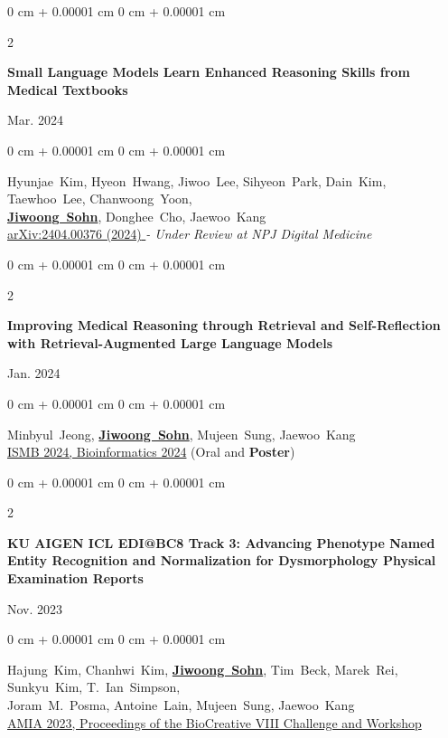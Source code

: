 \documentclass[10pt, letterpaper]{article}
\newenvironment{onecolentry}{
    \begin{adjustwidth}{
        0 cm + 0.00001 cm
    }{
        0 cm + 0.00001 cm
    }
}{
    \end{adjustwidth}
} %
\newenvironment{twocolentry}[2][]{
    \onecolentry
    \def\secondColumn{#2}
    \setcolumnwidth{\fill, 3.5 cm}
    \begin{paracol}{2}
}{
    \switchcolumn \raggedleft \secondColumn
    \end{paracol}
    \endonecolentry
} %
\begin{document}
       \begin{twocolentry}
            {
                Mar. 2024
            }
            {
                \textbf{Small Language Models Learn Enhanced Reasoning Skills from Medical Textbooks}
            } 
        \end{twocolentry}            
        \begin{onecolentry}
                \mbox{Hyunjae Kim}, \mbox{Hyeon Hwang},
                \mbox{Jiwoo Lee}, \mbox{Sihyeon Park},
                \mbox{Dain Kim}, \mbox{Taewhoo Lee},
                \mbox{Chanwoong Yoon}, \\
                \mbox{\textbf{\underline{Jiwoong Sohn}}}, \mbox{Donghee Cho}, \mbox{Jaewoo Kang} \\
        \href{https://arxiv.org/abs/2404.00376} {{arXiv:2404.00376 (2024)} } \textit{- Under Review at NPJ Digital Medicine}
        \end{onecolentry}
    \vspace{0.2 cm}
    
       \begin{twocolentry}
            {
                Jan. 2024
            }
            {
                \textbf{Improving Medical Reasoning through Retrieval and Self-Reflection with Retrieval-Augmented Large Language Models}
            }
        \end{twocolentry}           
        \begin{onecolentry}
                \mbox{Minbyul Jeong},
                \mbox{\textbf{\underline{Jiwoong Sohn}}}, \mbox{Mujeen Sung}, \mbox{Jaewoo Kang} \\
        \href{https://academic.oup.com/bioinformatics/article/40/Supplement_1/i119/7700892} {{ISMB 2024, Bioinformatics 2024}} 
        (Oral and \textbf{Poster})
    \end{onecolentry}
    \vspace{0.2 cm}
    
       \begin{twocolentry}
            {
                Nov. 2023
            }
            {
                \textbf{KU AIGEN ICL EDI@BC8 Track 3: Advancing Phenotype Named Entity Recognition and Normalization for Dysmorphology Physical Examination Reports}
            }
    \end{twocolentry}           
        \begin{onecolentry}
                \mbox{Hajung Kim},
                \mbox{Chanhwi Kim},
                \mbox{\textbf{\underline{Jiwoong Sohn}}}, \mbox{Tim Beck}, 
                \mbox{Marek Rei},
                \mbox{Sunkyu Kim},
                \mbox{T. Ian Simpson}, \\
                \mbox{Joram M. Posma},
                \mbox{Antoine Lain},
                \mbox{Mujeen Sung},
                \mbox{Jaewoo Kang}
                \\
        \href{https://spiral.imperial.ac.uk/handle/10044/1/108095}{AMIA 2023, Proceedings of the BioCreative VIII Challenge and Workshop}
    \end{onecolentry}
    \vspace{0.2 cm}
\end{document}
